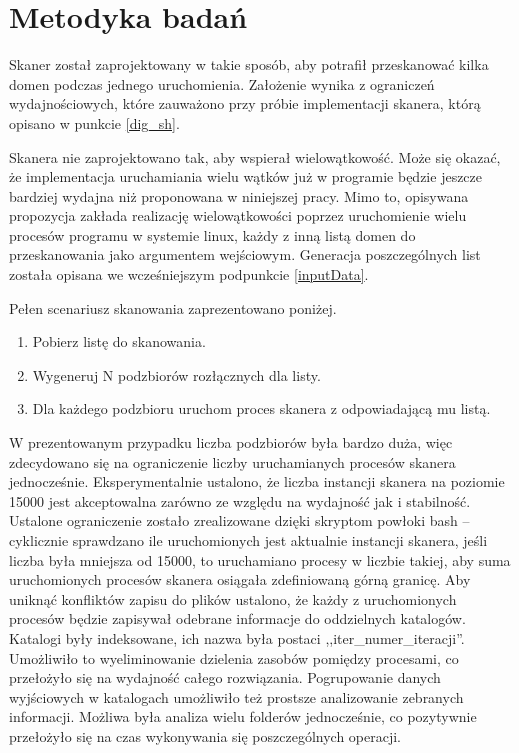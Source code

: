 \section{Metodyka badań}
\noindent Skaner został zaprojektowany w takie sposób, aby potrafił przeskanować kilka domen podczas jednego uruchomienia. Założenie wynika z
ograniczeń wydajnościowych, które zauważono przy próbie implementacji skanera, którą opisano w punkcie \ref{dig_sh}.

Skanera nie zaprojektowano tak, aby wspierał wielowątkowość. Może się okazać, że implementacja uruchamiania wielu wątków już w programie
będzie jeszcze bardziej wydajna niż proponowana w niniejszej pracy. Mimo to, opisywana propozycja zakłada realizację wielowątkowości
poprzez uruchomienie wielu procesów programu w systemie linux, każdy z inną listą domen do przeskanowania jako argumentem wejściowym.
Generacja poszczególnych list została opisana we wcześniejszym podpunkcie \ref{inputData}.

Pełen scenariusz skanowania zaprezentowano poniżej.
\begin{enumerate}
	\item Pobierz listę do skanowania.
	\item Wygeneruj N podzbiorów rozłącznych dla listy.
	\item Dla każdego podzbioru uruchom proces skanera z odpowiadającą mu listą.
\end{enumerate}

W prezentowanym przypadku liczba podzbiorów była bardzo duża, więc zdecydowano się na ograniczenie liczby uruchamianych procesów
skanera jednocześnie. Eksperymentalnie ustalono, że liczba instancji skanera na poziomie 15000 jest akceptowalna zarówno ze względu
na wydajność jak i stabilność. Ustalone ograniczenie zostało zrealizowane dzięki skryptom powłoki bash -- cyklicznie sprawdzano ile
uruchomionych jest aktualnie instancji skanera, jeśli liczba była mniejsza od 15000, to uruchamiano procesy w liczbie takiej,
aby suma uruchomionych procesów skanera osiągała zdefiniowaną górną granicę. Aby uniknąć konfliktów zapisu do plików ustalono,
że każdy z uruchomionych
procesów będzie zapisywał odebrane informacje do oddzielnych katalogów. Katalogi były indeksowane, ich nazwa była postaci
,,iter\_{numer\_iteracji}''. Umożliwiło to wyeliminowanie dzielenia zasobów pomiędzy procesami, co przełożyło się na wydajność całego
rozwiązania. Pogrupowanie danych wyjściowych w katalogach umożliwiło też prostsze analizowanie zebranych informacji. Możliwa była
analiza wielu folderów jednocześnie, co pozytywnie przełożyło się na czas wykonywania się poszczególnych operacji.

